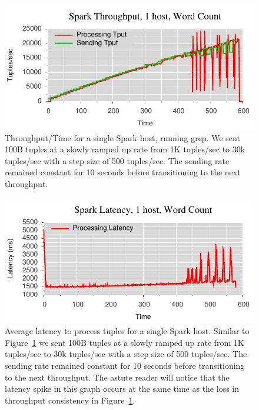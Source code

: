 \begin{figure}[t]
\centering
\includegraphics[width=1\linewidth]{figures/sp1_tput.pdf}
\caption{Throughput/Time for a single Spark host, running grep. We sent 100B tuples at a
slowly ramped up rate from 1K tuples/sec to 30k tuples/sec with a step size of
500 tuples/sec. The sending rate remained constant for 10 seconds before
transitioning to the next throughput.}
\label{fig:sb1-tput}
\end{figure}

\begin{figure}[t]
\centering
\includegraphics[width=1\linewidth]{figures/sp1_latency.pdf}
\caption{Average latency to process tuples for a single Spark host. Similar to
Figure~\ref{fig:sb1-tput} we sent 100B tuples at a slowly ramped up rate from 1K
tuples/sec to 30k tuples/sec with a step size of 500 tuples/sec. The sending
rate remained constant for 10 seconds before transitioning to the next
throughput. The astute reader will notice that the latency spike in this graph
occurs at the same time as the loss in throughput consistency in
Figure~\ref{fig:sb1-tput}.}
\label{fig:label-me-if-you-want}
\end{figure}



